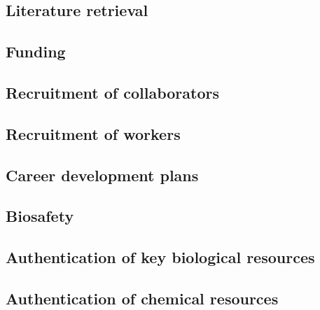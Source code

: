 \documentclass[11pt,letterpaper]{article}
\begin{document}
\subsection{Literature retrieval}
\label{sec:orga414bb2}




\subsection{Funding}
\label{sec:orga8a773e}



\subsection{Recruitment of collaborators}
\label{sec:org3ddd2bd}



\subsection{Recruitment of workers}
\label{sec:org44a15b7}



\subsection{Career development plans}
\label{sec:org1f379f4}



\subsection{Biosafety}
\label{sec:org67e92dc}




\subsection{Authentication of key biological resources}
\label{sec:orgbc140b0}


\subsection{Authentication of chemical resources}
\label{sec:orgf3fbd4b}
\end{document}
